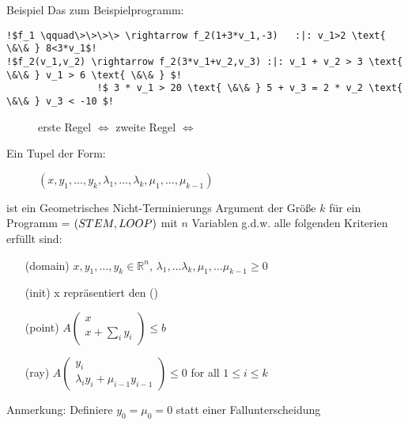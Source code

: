 \begin{frame}[fragile]
	\begin{exampleblock}{Beispiel}
		Das \its zum Beispielprogramm: \newline
		\begin{lstlisting}[linewidth=10.5cm, escapechar = !]
!$f_1 \qquad\>\>\>\> \rightarrow f_2(1+3*v_1,-3)   :|: v_1>2 \text{ \&\& } 8<3*v_1$!
!$f_2(v_1,v_2) \rightarrow f_2(3*v_1+v_2,v_3) :|: v_1 + v_2 > 3 \text{ \&\& } v_1 > 6 \text{ \&\& } $!
				!$ 3 * v_1 > 20 \text{ \&\& } 5 + v_3 = 2 * v_2 \text{ \&\& } v_3 < -10 $!
		\end{lstlisting}
		\begin{figure}[H]
			\centering
			erste Regel $\Leftrightarrow$ \stem \hspace*{.5cm}
			zweite Regel $\Leftrightarrow$ \loopt
		\end{figure}
	\end{exampleblock}	
\end{frame}

\begin{frame}
	\begin{definition}
		\label{def:gna}
		Ein Tupel der Form:
		\vspace{-1em}
		\begin{figure}
			\centering
			$(x, y_1, \dots, y_k, \lambda_1, \dots, \lambda_k, \mu_1, \dots, \mu_{k-1})$
		\end{figure}  
		\vspace{-1em}
		ist ein Geometrisches Nicht-Terminierungs Argument der Gr\"o\ss e $k$ f\"ur ein Programm = $(STEM, LOOP)$ mit $n$ Variablen g.d.w. alle folgenden Kriterien erf\"ullt sind:
		\begin{itemize}
			\setlength{\itemindent}{1in}
			\item[(domain)] $x, y_1, \dots, y_k \in \mathbb{R}^n$, $\lambda_1, \dots \lambda_k, \mu_1, \dots \mu_{k-1} \ge 0$
			\item[(init)] x repr\"asentiert den \startterm (\stem)
			\item[(point)] $A\begin{pmatrix} x \\ x + \sum_i y_i \end{pmatrix} \le b$
			\item[(ray)] $A\begin{pmatrix} y_i \\ \lambda_i y_i + \mu_{i-1} y_{i-1} \end{pmatrix} \le 0$ for all $1 \le i \le k$
		\end{itemize}
		Anmerkung: Definiere $y_0 = \mu_0 = 0$ statt einer Fallunterscheidung
	\end{definition}
\end{frame}

